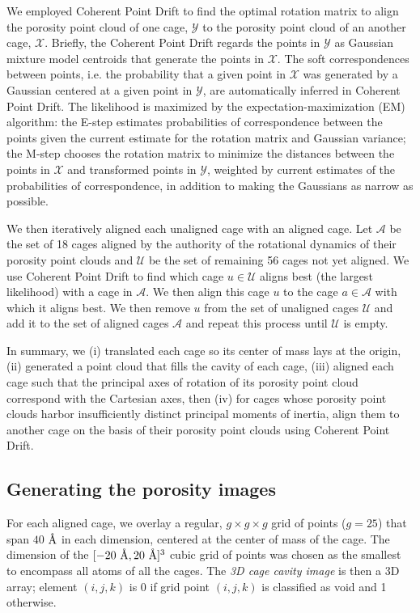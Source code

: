 \documentclass[journal=jacsat,manuscript=article,layout=traditional]{achemso}
\newcommand{\angstrom}{\mbox{\normalfont\AA}}
\begin{document}
{We employed Coherent Point Drift\cite{myronenko2010point} to find the optimal rotation matrix to align the porosity point cloud of one cage, $\mathcal{Y}$ to the porosity point cloud of an another cage, $\mathcal{X}$. Briefly, the Coherent Point Drift regards the points in $\mathcal{Y}$ as Gaussian mixture model centroids that generate the points in $\mathcal{X}$. The soft correspondences between points, i.e. the probability that a given point in $\mathcal{X}$ was generated by a Gaussian centered at a given point in $\mathcal{Y}$, are automatically inferred in Coherent Point Drift. The likelihood is maximized by the expectation-maximization (EM) algorithm: the E-step estimates probabilities of correspondence between the points given the current estimate for the rotation matrix and Gaussian variance; the M-step chooses the rotation matrix to minimize the distances between the points in $\mathcal{X}$ and transformed points in $\mathcal{Y}$, weighted by current estimates of the probabilities of correspondence, in addition to making the Gaussians as narrow as possible.

We then iteratively aligned each unaligned cage with an aligned cage. Let $\mathcal{A}$ be the set of 18 cages aligned by the authority of the rotational dynamics of their porosity point clouds and $\mathcal{U}$ be the set of remaining 56 cages not yet aligned. We use Coherent Point Drift to find which cage $u \in \mathcal{U}$ aligns best (the largest likelihood) with a cage in $\mathcal{A}$. We then align this cage $u$ to the cage $a \in \mathcal{A}$ with which it aligns best. We then remove $u$ from the set of unaligned cages $\mathcal{U}$ and add it to the set of aligned cages $\mathcal{A}$ and repeat this process until $\mathcal{U}$ is empty.

In summary, we (i) translated each cage so its center of mass lays at the origin, (ii) generated a point cloud that fills the cavity of each cage, (iii) aligned each cage such that the principal axes of rotation of its porosity point cloud correspond with the Cartesian axes, then (iv) for cages whose porosity point clouds harbor insufficiently distinct principal moments of inertia, align them to another cage on the basis of their porosity point clouds using Coherent Point Drift\cite{myronenko2010point}.
}

\subsection{Generating the porosity images}
For each aligned cage, we overlay a regular, $g\times g\times g$ grid of points ($g=25$) that span $40$ $\angstrom$ in each dimension, centered at the center of mass of the cage. The dimension of the $[-20 \text{ } \angstrom, 20 \text{ } \angstrom]^3$ cubic grid of points was chosen as the smallest to encompass all atoms of all the cages. The \emph{3D cage cavity image} is then a 3D array; element $(i, j, k)$ is 0 if grid point $(i, j, k)$ is classified as void and 1 otherwise. 
\end{document}
